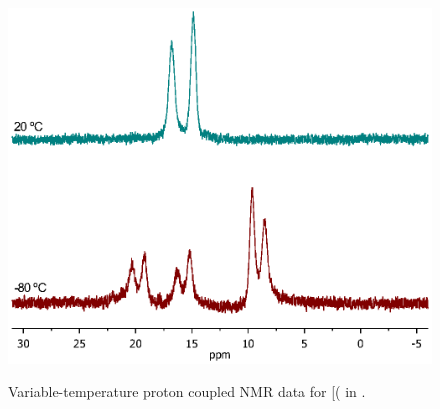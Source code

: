 \begin{figure}[htp]
\begin{center}
\vspace{0.5cm}
\includegraphics[scale = 0.8, trim = 0cm 8cm 0.5cm 10cm, clip]{../NMR/Coupledstacked.eps}
\caption[VT \proton-coupled \phosphorus{} NMR for [(\tButhixantphos\ce{)H]+}]{Variable-temperature proton coupled \phosphorus{} NMR data for [(\tButhixantphos\ce{)H]+} in .}
\vspace{0.2cm}
\label{VTStBuHcoupled}
\end{center}
\end{figure}  
\vspace{0.2cm}




